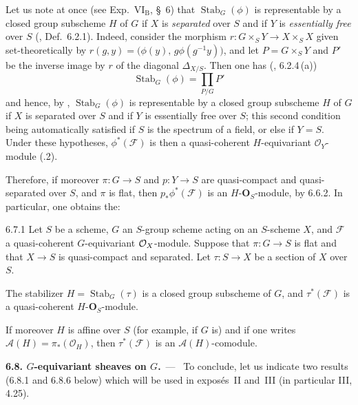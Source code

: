 Let us note at once (see Exp.~\(\mathrm{VI}_{\mathrm{B}}\), \S~6) that
\(\operatorname{Stab}_{G}(\phi)\) is representable by a closed group
subscheme \(H\) of \(G\) if \(X\) is \emph{separated} over \(S\) and if \(Y\) is
\emph{essentially free} over \(S\) (\cf \loccit, Def.~6.2.1). Indeed, consider
the morphism
\(r\colon G\times_{S}Y\to X\times_{S}X\) given set-theoretically by
\(r(g,y)=\bigl(\phi(y),\,g\phi(g^{-1}y)\bigr)\), and let \(P=G\times_{S}Y\) and
\(P'\) be the inverse image by \(r\) of the diagonal \(\Delta_{X/S}\). Then one
has (\cf \loccit, 6.2.4\,(a))
\[
\operatorname{Stab}_{G}(\phi)=\prod_{P/G}P'
\]
and hence, by \loccit, \(\operatorname{Stab}_{G}(\phi)\) is representable by a
closed group subscheme \(H\) of \(G\) if \(X\) is separated over \(S\) and if
\(Y\) is essentially free over \(S\); this second condition being
automatically satisfied if \(S\) is the spectrum of a field, or else if
\(Y=S\). Under these hypotheses, \(\phi^{*}(\mathcal{F})\) is then a
quasi-coherent \(H\)-equivariant \(\mathcal{O}_{Y}\)-module (.2).

Therefore, if moreover \(\pi\colon G\to S\) and \(p\colon Y\to S\) are
quasi-compact and quasi-separated over \(S\), and \(\pi\) is flat, then
\(p_{*}\phi^{*}(\mathcal{F})\) is an \(H\text{-}\mathbf{O}_{S}\)-module, by
6.6.2. In particular, one obtains the:

\begin{corollary}{6.7.1}\label{I.6.7.1}
Let \(S\) be a scheme, \(G\) an \(S\)-group scheme acting on an \(S\)-scheme
\(X\), and \(\mathcal{F}\) a quasi-coherent \(G\)-equivariant \(\mathcal{O}_X\)-module.
Suppose that \(\pi\colon G\to S\) is flat and that \(X\to S\) is quasi-compact
and separated. Let \(\tau\colon S\to X\) be a section of \(X\) over \(S\).
\par
\begin{enumeratei}
\item The stabilizer \(H=\operatorname{Stab}_{G}(\tau)\) is a closed group
subscheme of \(G\), and \(\tau^{*}(\mathcal{F})\) is a quasi-coherent
\(H\text{-}\mathbf{O}_{S}\)-module.
\item If moreover \(H\) is affine over \(S\) (for example, if \(G\) is) and if
one writes \(\mathcal{A}(H)=\pi_{*}(\mathcal{O}_{H})\), then
\(\tau^{*}(\mathcal{F})\) is an \(\mathcal{A}(H)\)-comodule.
\end{enumeratei}
\end{corollary}

\par{}
\noindent\textbf{6.8. \(G\)-equivariant sheaves on \(G\).}\ ---\ \label{I.sec.6.8}
To conclude, let us indicate two results (6.8.1 and 6.8.6 below) which will
be used in exposés~II and~III (\cf in particular III, 4.25).

